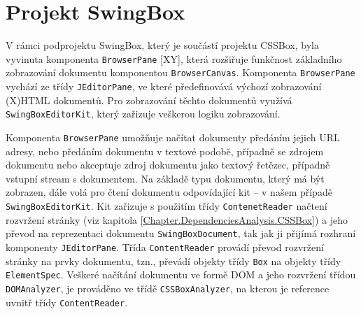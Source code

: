 \section{Projekt SwingBox}
\label{Chapter.DependenciesAnalysis.SwingBox}

V rámci podprojektu SwingBox, který je součástí projektu CSSBox, byla vyvinuta komponenta \texttt{BrowserPane} [XY], která rozšiřuje funkčnost základního zobrazování dokumentu komponentou \texttt{BrowserCanvas}. Komponenta \texttt{BrowserPane} vychází ze třídy \texttt{JEditorPane}, ve které předefinovává výchozí zobrazování (X)HTML dokumentů. Pro zobrazování těchto dokumentů využívá \texttt{SwingBoxEditorKit}, který zařizuje veškerou logiku zobrazování.

Komponenta \texttt{BrowserPane} umožňuje načítat dokumenty předáním jejich URL adresy, nebo předáním dokumentu v textové podobě, případně se zdrojem dokumentu nebo akceptuje zdroj dokumentu jako textový řetězec, případně vstupní stream s dokumentem. Na základě typu dokumentu, který má být zobrazen, dále volá pro čtení dokumentu odpovídající kit – v našem případě \texttt{SwingBoxEditorKit}. Kit zařizuje s použitím třídy \texttt{ContenetReader} načtení rozvržení stránky (viz kapitola \ref{Chapter.DependenciesAnalysis.CSSBox}) a jeho převod na reprezentaci dokumentu \texttt{SwingBoxDocument}, tak jak ji přijímá rozhraní komponenty \texttt{JEditorPane}. Třída \texttt{ContentReader} provádí převod rozvržení stránky na prvky dokumentu, tzn., převádí objekty třídy \texttt{Box} na objekty třídy \texttt{ElementSpec}. Veškeré načítání dokumentu ve formě DOM a jeho rozvržení třídou \texttt{DOMAnalyzer}, je prováděno ve třídě \texttt{CSSBoxAnalyzer}, na kterou je reference uvnitř třídy \texttt{ContentReader}.

